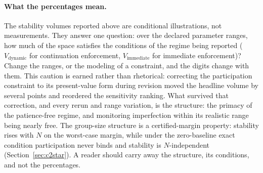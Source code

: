 \documentclass[manuscript,screen,review]{jair}
\begin{document}
\paragraph{What the percentages mean.}
The stability volumes reported above are conditional illustrations, not measurements. They answer one question: over the declared parameter ranges, how much of the space satisfies the conditions of the regime being reported ($V_{\mathrm{dynamic}}$ for continuation enforcement, $V_{\mathrm{immediate}}$ for immediate enforcement)? Change the ranges, or the modeling of a constraint, and the digits change with them. This caution is earned rather than rhetorical: correcting the participation constraint to its present-value form during revision moved the headline volume by several points and reordered the sensitivity ranking. What survived that correction, and every rerun and range variation, is the structure: the primacy of the patience-free regime, and monitoring imperfection within its realistic range being nearly free. The group-size structure is a certified-margin property: stability rises with $N$ on the worst-case margin, while under the zero-baseline exact condition participation never binds and stability is $N$-independent (Section~\ref{sec:c2star}). A reader should carry away the structure, its conditions, and not the percentages.
\end{document}
